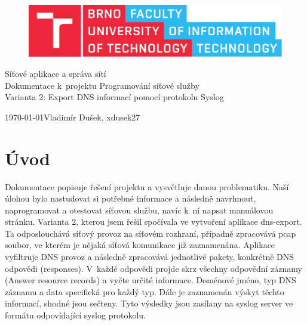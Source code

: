 \documentclass[11pt, a4paper, titlepage]{article}
\begin{document}
\begin{titlepage}
	\begin{center}
		\begin{figure}[htb]
			\centering
			\includegraphics[width=0.85\hsize]{images/fitlogo.pdf}
		\end{figure}
		{\Huge Síťové aplikace a správa sítí} \\
		\bigskip
		{\LARGE Dokumentace k~projektu Programování síťové služby} \\
		\bigskip
		{\Large Varianta 2: Export DNS informací pomocí protokolu Syslog}
	\end{center}
	{\Large \today \hfill Vladimír Dušek, xdusek27}
\end{titlepage}


\tableofcontents
\newpage


\section{Úvod}

Dokumentace popisuje řešení projektu a vysvětluje danou problematiku. Naší úlohou bylo nastudovat si potřebné informace a následně navrhnout, naprogramovat a otestovat síťovou službu, navíc k~ní napsat manuálovou stránku. Varianta 2, kterou jsem řešil spočívala ve vytvoření aplikace dns-export. Ta odposlouchává síťový provoz na síťovém rozhraní, případně zpracovává pcap soubor, ve kterém je nějaká síťová komunikace již zaznamenána. Aplikace vyfiltruje DNS provoz a následně zpracovává jednotlivé pakety, konkrétně DNS odpovědi (responses). V~každé odpovědi projde skrz všechny odpovědní záznamy (Answer resource records) a vyčte určité informace. Doménové jméno, typ DNS záznamu a data specifická pro každý typ. Dále je zaznamenán výskyt těchto informací, shodné jsou sečteny. Tyto výsledky jsou zasílany na syslog server ve formátu odpovídající syslog protokolu.
\end{document}
